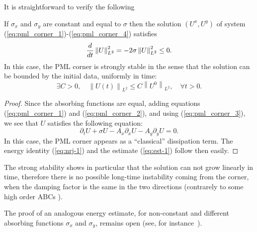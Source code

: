 \documentclass[a4paper]{article}
\begin{document}
It is straightforward to verify the following
\begin{theo}
If $\sigma_{x}$ and $\sigma_{y}$ are constant and equal to $\sigma$ 
then the solution $(U^{x},U^{y})$ of system 
(\ref{eq:pml_corner_1})-(\ref{eq:pml_corner_4}) satisfies
\begin{equation}
\label{eq:nrj-1}
\frac{d}{dt}\left\|U\right\|_{L^2}^2=-2\sigma\left\|U\right\|_{L^2}^2\le 0.
\end{equation}
In this case, the PML corner is strongly stable in the sense that the
solution can be bounded by the initial data, uniformly in time:
\begin{equation}
\label{eq:est-1}
\exists C>0, \quad \left\| U (t)\right\|_{L^2} \le C \left\| U^0 \right\|_{L^2},
\quad \forall t >0. 
\end{equation}

\end{theo}
\begin{proof}
Since the absorbing functions are equal, adding equations 
(\ref{eq:pml_corner_1}) and (\ref{eq:pml_corner_2}), and using
(\ref{eq:pml_corner_3}), we see that $U$ satisfies the following
equation:
\begin{equation}
 \label{eq:pml-coins}
\partial_{t}U+ \sigma U-A_{x}\partial_{x}U-A_{y}\partial_{y}U=0.
\end{equation}
In this case, the PML corner appears as a ``classical'' dissipation
term. The energy identity (\ref{eq:nrj-1}) and the estimate (\ref{eq:est-1})
follow then easily.
\end{proof}

The strong stability shows in particular that the solution can not grow 
linearly in time, therefore there is no possible long-time instability 
coming from the corner, when the damping factor is the same in the two 
directions (contrarely to some high order ABCs \cite{Giv-Hag-Pat:06}).

The proof of an analogous energy estimate, for non-constant and different 
absorbing functions $\sigma_{x}$ and $\sigma_{y}$, remains open
(see, for instance~\cite{BJ:02}).
\end{document}
